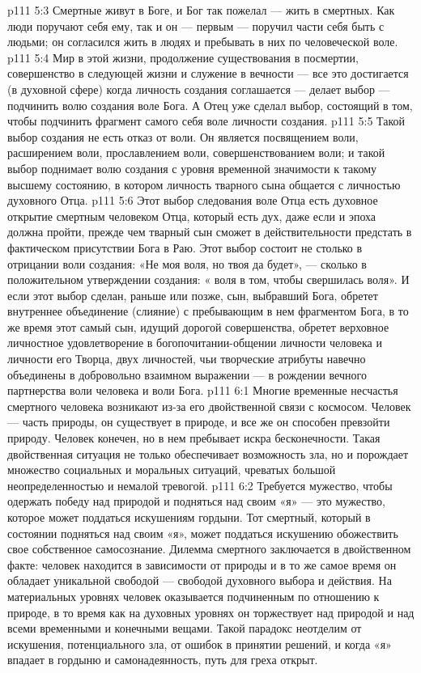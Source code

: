 \vs p111 5:3 Смертные живут в Боге, и Бог так пожелал --- жить в смертных. Как люди поручают себя ему, так и он --- первым --- поручил части себя быть с людьми; он согласился жить в людях и пребывать в них по человеческой воле.
\vs p111 5:4 Мир в этой жизни, продолжение существования в посмертии, совершенство в следующей жизни и служение в вечности --- все это достигается (в духовной сфере)  когда личность создания соглашается --- делает выбор --- подчинить волю создания воле Бога. А Отец уже сделал выбор, состоящий в том, чтобы подчинить фрагмент самого себя воле личности создания.
\vs p111 5:5 Такой выбор создания не есть отказ от воли. Он является посвящением воли, расширением воли, прославлением воли, совершенствованием воли; и такой выбор поднимает волю создания с уровня временной значимости к такому высшему состоянию, в котором личность тварного сына общается с личностью духовного Отца.
\vs p111 5:6 Этот выбор следования воле Отца есть духовное открытие смертным человеком Отца, который есть дух, даже если и эпоха должна пройти, прежде чем тварный сын сможет в действительности предстать в фактическом присутствии Бога в Раю. Этот выбор состоит не столько в отрицании воли создания: «Не моя воля, но твоя да будет», --- сколько в положительном утверждении создания: « воля в том, чтобы свершилась  воля». И если этот выбор сделан, раньше или позже, сын, выбравший Бога, обретет внутреннее объединение (слияние) с пребывающим в нем фрагментом Бога, в то же время этот самый сын, идущий дорогой совершенства, обретет верховное личностное удовлетворение в богопочитании\hyp{}общении личности человека и личности его Творца, двух личностей, чьи творческие атрибуты навечно объединены в добровольно взаимном выражении --- в рождении вечного партнерства воли человека и воли Бога.
\vs p111 6:1 Многие временные несчастья смертного человека возникают из\hyp{}за его двойственной связи с космосом. Человек --- часть природы, он существует в природе, и все же он способен превзойти природу. Человек конечен, но в нем пребывает искра бесконечности. Такая двойственная ситуация не только обеспечивает возможность зла, но и порождает множество социальных и моральных ситуаций, чреватых большой неопределенностью и немалой тревогой.
\vs p111 6:2 Требуется мужество, чтобы одержать победу над природой и подняться над своим «я» --- это мужество, которое может поддаться искушениям гордыни. Тот смертный, который в состоянии подняться над своим «я», может поддаться искушению обожествить свое собственное самосознание. Дилемма смертного заключается в двойственном факте: человек находится в зависимости от природы и в то же самое время он обладает уникальной свободой --- свободой духовного выбора и действия. На материальных уровнях человек оказывается подчиненным по отношению к природе, в то время как на духовных уровнях он торжествует над природой и над всеми временными и конечными вещами. Такой парадокс неотделим от искушения, потенциального зла, от ошибок в принятии решений, и когда «я» впадает в гордыню и самонадеянность, путь для греха открыт.
